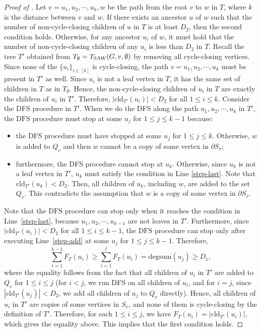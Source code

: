 \documentclass[11pt]{amsart}
\newcommand{\abs}[1]{\ensuremath{\left\vert#1\right\vert}}
\theoremstyle{definition}
\theoremstyle{remark}
\begin{document}
\begin{proof}[Proof of ]
Let $v = u_1,u_2,\cdots,u_k, w$ be the path from the root $v$ to $w$ in $T$, where $k$ is the distance between $v$ and $w$. If there exists an ancestor $u$ of $w$ such that the number of non-cycle-closing children of $u$ in $T$ is at least $D_2$, then the second condition holds. Otherwise, for any ancestor $u_i$ of $w$, it must hold that the number of non-cycle-closing children of any $u_i$ is less than $D_2$ in $T$. Recall the tree $T'$ obtained from $T_\emptyset = T_{\textnormal{SAW}}(G,v,\emptyset)$ by removing all cycle-closing vertices. 
Since none of the $\{u_i\}_{i\in[k]}$ is cycle-closing, the path $v= u_1,u_2,\cdots,u_k$ must be present in $T'$ as well.
Since $u_i$ is not a leaf vertex in $T$, it has the same set of children in $T$ as in $T_\emptyset$. Hence, the non-cycle-closing children of $u_i$ in $T$ are exactly the children of $u_i$ in $T'$. Therefore, $|\text{cld}_{T'}(u_i)| < D_2$ for all $1 \leq i \leq k$.
Consider the DFS procedure in $T'$. When we do the DFS along the path $u_1,u_2,\cdots,u_k$ in $T'$, the $\text{DFS}$ procedure must stop at some $u_j$ for $1 \leq j \leq k-1$ because:
\begin{itemize}
    \item the DFS procedure must have stopped at some $u_j$ for $1 \leq j \leq k$. Otherwise, $w$ is added to $Q_v$ and then $w$ cannot be a copy of some vertex in $\partial S_v$;
    \item furthermore, the DFS procedure cannot stop at $u_k$. Otherwise, since $u_k$ is not a leaf vertex in $T'$, $u_k$ must satisfy the condition in Line \ref{step-last}. Note that $\text{cld}_{T'}(u_k) < D_2$. Then, all children of $u_k$, including $w$, are added to the set $Q_v$. This contradicts the assumption that $w$ is a copy of some vertex in $\partial S_v$.
\end{itemize} 
Note that the $\text{DFS}$ procedure can stop only when it reaches the condition in Line~\ref{step-last}, because $u_1,u_2,\cdots,u_{k-1}$ are not leaves in $T'$. 
Furthermore, since $|\text{cld}_{T'}(u_i)|< D_2$ for all $1 \leq i \leq k-1$, the $\text{DFS}$ procedure can stop only after executing Line~\ref{step-add} at some $u_j$ for $1\leq j \leq k-1$. Therefore, 
$$\sum_{i=1}^{k-1} F_T(u_i) \geq \sum_{i=1}^{j} F_T(u_i) = \text{degsum}(u_j) \geq D_1,$$ 
where the equality follows from the fact that all children of $u_i$ in $T'$ are added to $Q_v$ for $1\leq i\leq j$ (for $i < j$, we run DFS on all children of $u_i$, and for $i = j$, since $\abs{\text{cld}_{T'}(u_j)} < D_2$, we add all children of $u_j$ to $Q_v$ directly). Hence, all children of $u_i$ in $T'$ are copies of some vertices in $S_v$, and none of them is cycle-closing by the definition of $T'$. Therefore, for each $1 \le i \le j$, we have $F_T(u_i)=|\text{cld}_{T'}(u_i)|$, which gives the equality above. This implies that the first condition holds. 

\end{proof}
\end{document}
